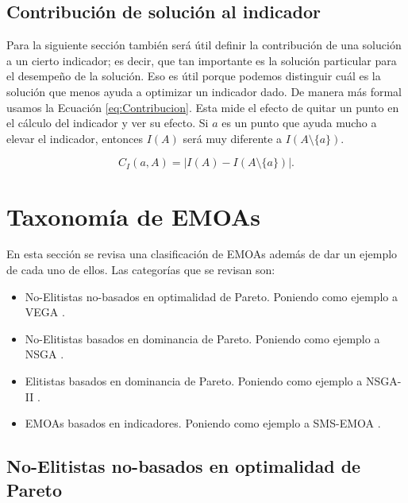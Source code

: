 


\subsection*{Contribución de solución al indicador}
Para la siguiente sección también será útil definir la contribución de una solución a un cierto indicador; es decir, que tan importante es la solución particular para el desempeño de la solución. Eso es útil porque podemos distinguir cuál es la solución que menos ayuda a optimizar un indicador dado. De manera más formal usamos la Ecuación \eqref{eq:Contribucion}. Esta mide el efecto de quitar un punto en el cálculo del indicador y ver su efecto. Si $a$ es un punto que ayuda mucho a elevar el indicador, entonces $I(A)$ será muy diferente a $I(A \setminus \{a\})$.

\begin{equation} \label{eq:Contribucion}
    C_I(a,A)=|I(A)-I(A \setminus \{a\}) |.
\end{equation}


\section{Taxonomía de EMOAs} \label{sec:QIs_tax}

En esta sección se revisa una clasificación de EMOAs además de dar un ejemplo de cada uno de ellos. Las categorías que se revisan son: 

\begin{itemize}
\item No-Elitistas no-basados en optimalidad de Pareto. Poniendo como ejemplo a VEGA \cite{schafferMultipleObjectiveOptimization1984}.
\item No-Elitistas basados en dominancia de Pareto. Poniendo como ejemplo a NSGA \cite{debFastElitistNondominated2000}.
\item Elitistas basados en dominancia de Pareto. Poniendo como ejemplo a NSGA-II \cite{seifbarghyNovelMetaheuristicAlgorithm2016}.
\item EMOAs basados en indicadores. Poniendo como ejemplo a SMS-EMOA \cite{SMS-EMOA}.
\end{itemize}


\subsection*{No-Elitistas no-basados en optimalidad de Pareto} \label{sec:VEGA}


